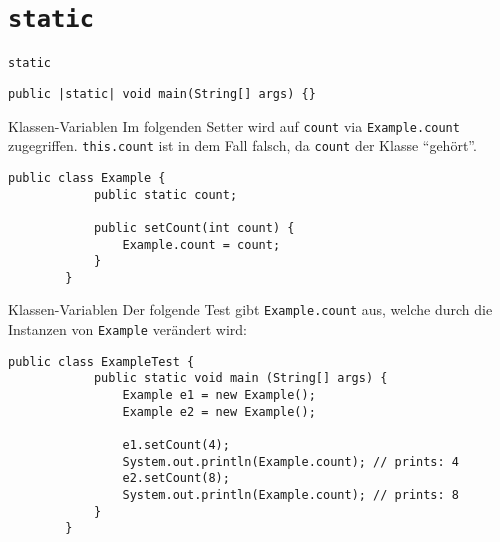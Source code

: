 \section{\texttt{static}}
\begin{frame}[fragile]{\texttt{static}}
	\vfill
    \vfill
    \pause
    \begin{lstlisting}[gobble=8]
        public |static| void main(String[] args) {}
    \end{lstlisting}
\end{frame}

\begin{frame}[fragile]{Klassen-Variablen}
	Im folgenden Setter wird auf \texttt{count} via \texttt{Example.count} zugegriffen.
    \texttt{this.count} ist in dem Fall falsch, da \texttt{count} der Klasse \enquote{gehört}.	
    \begin{lstlisting}[gobble=8]
        public class Example {
            public static count;

            public setCount(int count) {
                Example.count = count;
            }
        }
	\end{lstlisting}
\end{frame}

\begin{frame}[fragile]{Klassen-Variablen}
    Der folgende Test gibt \texttt{Example.count} aus, welche durch die Instanzen von \texttt{Example} verändert wird:
	\begin{lstlisting}[gobble=8]
        public class ExampleTest {
            public static void main (String[] args) {
                Example e1 = new Example();
                Example e2 = new Example();
                
                e1.setCount(4);
                System.out.println(Example.count); // prints: 4
                e2.setCount(8);
                System.out.println(Example.count); // prints: 8
            }
        }
	\end{lstlisting}
\end{frame}

